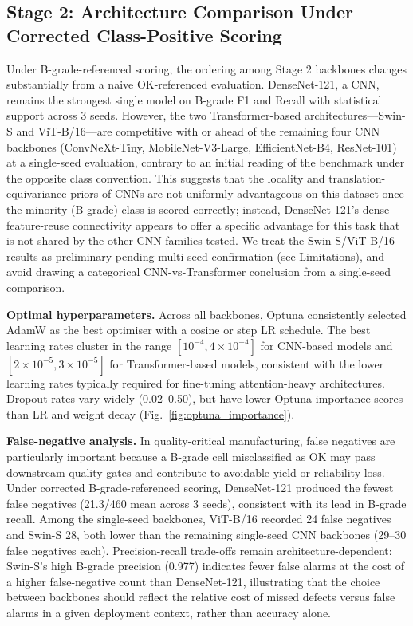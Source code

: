 \documentclass[conference]{IEEEtran}
\begin{document}
\subsection{Stage 2: Architecture Comparison Under Corrected Class-Positive Scoring}

Under B-grade-referenced scoring, the ordering among Stage 2 backbones changes substantially from a naive OK-referenced evaluation. DenseNet-121, a CNN, remains the strongest single model on B-grade F1 and Recall with statistical support across 3 seeds. However, the two Transformer-based architectures---Swin-S and ViT-B/16---are competitive with or ahead of the remaining four CNN backbones (ConvNeXt-Tiny, MobileNet-V3-Large, EfficientNet-B4, ResNet-101) at a single-seed evaluation, contrary to an initial reading of the benchmark under the opposite class convention. This suggests that the locality and translation-equivariance priors of CNNs are not uniformly advantageous on this dataset once the minority (B-grade) class is scored correctly; instead, DenseNet-121's dense feature-reuse connectivity appears to offer a specific advantage for this task that is not shared by the other CNN families tested. We treat the Swin-S/ViT-B/16 results as preliminary pending multi-seed confirmation (see Limitations), and avoid drawing a categorical CNN-vs-Transformer conclusion from a single-seed comparison.

\textbf{Optimal hyperparameters.} Across all backbones, Optuna consistently selected AdamW as the best optimiser with a cosine or step LR schedule. The best learning rates cluster in the range $[10^{-4}, 4\times10^{-4}]$ for CNN-based models and $[2\times10^{-5}, 3\times10^{-5}]$ for Transformer-based models, consistent with the lower learning rates typically required for fine-tuning attention-heavy architectures. Dropout rates vary widely (0.02--0.50), but have lower Optuna importance scores than LR and weight decay (Fig.~\ref{fig:optuna_importance}).

\textbf{False-negative analysis.} In quality-critical manufacturing, false negatives are particularly important because a B-grade cell misclassified as OK may pass downstream quality gates and contribute to avoidable yield or reliability loss. Under corrected B-grade-referenced scoring, DenseNet-121 produced the fewest false negatives (21.3/460 mean across 3 seeds), consistent with its lead in B-grade recall. Among the single-seed backbones, ViT-B/16 recorded 24 false negatives and Swin-S 28, both lower than the remaining single-seed CNN backbones (29--30 false negatives each). Precision-recall trade-offs remain architecture-dependent: Swin-S's high B-grade precision (0.977) indicates fewer false alarms at the cost of a higher false-negative count than DenseNet-121, illustrating that the choice between backbones should reflect the relative cost of missed defects versus false alarms in a given deployment context, rather than accuracy alone.
\end{document}
